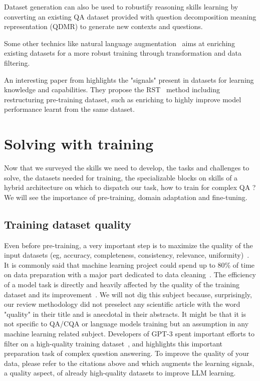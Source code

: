 \documentclass[acmsmall]{acmart}
\begin{document}
Dataset generation can also be used to robustify reasoning skills learning\citep{trivediTeachingBroadReasoning2022} by converting an existing QA dataset provided with question decomposition meaning representation (QDMR) to generate new contexts and questions.

Some other technics like natural language augmentation~\citep{dholeNLAugmenterFrameworkTaskSensitive2022} aims at enriching existing datasets for a more robust training through transformation and data filtering.

An interesting paper from \citet{yuanReStructuredPretraining2022} highlights the "signals" present in datasets for learning knowledge and capabilities. They propose the RST~\citep{yuanReStructuredPretraining2022} method including restructuring pre-training dataset, such as enriching to highly improve model performance learnt from the same dataset.


\section{Solving with training}\label{sec_training}
Now that we surveyed the skills we need to develop, the tasks and challenges to solve, the datasets needed for training, the specializable blocks on skills of a hybrid architecture on which to dispatch our task, how to train for complex QA ? We will see the importance of pre-training, domain adaptation and fine-tuning.

\subsection{Training dataset quality}
Even before pre-training, a very important step is to maximize the quality of the input datasets (eg, accuracy, completeness, consistency, relevance, uniformity)~\citep{budachEffectsDataQuality2022, whangDataCollectionQuality2022}. It is commonly said that machine learning project could spend up to 80\% of time on data preparation with a major part dedicated to data cleaning~\citep{pfistererHumanCenteredAutoML2019}. The efficiency of a model task is directly and heavily affected by the quality of the training dataset and its improvement~\citep{budachEffectsDataQuality2022, whangDataCollectionQuality2022}. We will not dig this subject because, surprisingly, our review methodology did not preselect any scientific article with the word "quality" in their title and is anecdotal in their abstracts. It might be that it is not specific to QA/CQA or language models training but an assumption in any machine learning related subject. Developers of GPT-3 spent important efforts to filter on a high-quality training dataset~\citep{zongSurveyGPT32022}, and \citet{sunImportanceBuildingHighquality2022} highlights this important preparation task of complex question answering. To improve the quality of your data, please refer to the citations above and \citet{yuanReStructuredPretraining2022} which augments the learning signals, a quality aspect, of already high-quality datasets to improve LLM learning.
\end{document}

